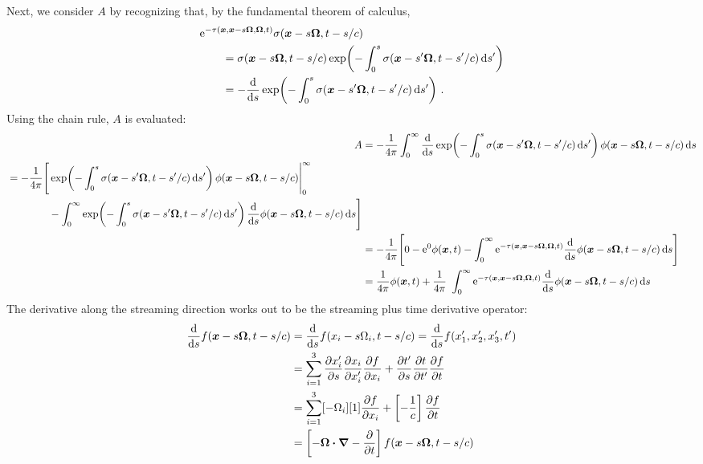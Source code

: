 Next, we consider $A$ by recognizing that, by the fundamental theorem of
calculus,
\begin{align*}
  \lefteqn{\eexp^{ -\tau(\vec{x}, \vec{x} - s \vec{\Omega}, \vec{\Omega}, t)}
  \sigma(\vec{x} - s \vec{\Omega}, t-s/c)}\qquad&
  \\
  &= \sigma(\vec{x} - s \vec{\Omega}, t-s/c) \expp{ -\int_{0}^{s}
  \sigma(\vec{x}-s'\vec{\Omega}, t-s'/c) \ud s'}
  \\
  &= -\oder{}{s}
    \expp{ -\int_{0}^{s} \sigma(\vec{x}-s'\vec{\Omega}, t-s'/c) \ud s'}\,.
\end{align*}
Using the chain rule, $A$ is evaluated:
\begin{align*}
  A &= 
  -\frac{1}{4\pi}\int_{0}^{\infty}
  \oder{}{s}
    \expp{- \int_{0}^{s} \sigma(\vec{x}-s'\vec{\Omega}, t-s'/c) \ud s'}
  \phi(\vec{x} - s \vec{\Omega}, t-s/c)
  \ud s
  \\
    \begin{split}
  &=-\frac{1}{4\pi} \Bigg[ 
\expp{- \int_{0}^{s} \sigma(\vec{x}-s'\vec{\Omega}, t-s'/c) \ud s'} 
\phi(\vec{x} - s \vec{\Omega}, t-s/c) \Bigg|_{0}^{\infty}
\\
&\qquad\qquad- \int_{0}^{\infty} \expp{- \int_{0}^{s} \sigma(\vec{x}-s'\vec{\Omega}, t-s'/c) \ud s'}
\oder{}{s} \phi(\vec{x} - s \vec{\Omega}, t-s/c)
\ud s
  \Bigg]
    \end{split}
  \\
  &=-\frac{1}{4\pi} \Bigg[ 
0 -  
\eexp^0 \phi(\vec{x}, t)
- \int_{0}^{\infty} \eexp^{-\tau(\vec{x}, \vec{x} - s \vec{\Omega}, \vec{\Omega}, t)}
\oder{}{s} \phi(\vec{x} - s \vec{\Omega}, t-s/c)
\ud s
  \Bigg]
  \\
 &=\frac{1}{4\pi}\phi(\vec{x}, t)
+ \frac{1}{4\pi}\ \int_{0}^{\infty} \eexp^{-\tau(\vec{x}, \vec{x} - s \vec{\Omega}, \vec{\Omega}, t)}
\oder{}{s} \phi(\vec{x} - s \vec{\Omega}, t-s/c)
\ud s
\end{align*}
The derivative along the streaming direction works out to be the streaming plus
time derivative operator:
\begin{align*}
  \frac{\mathrm{d} }{\mathrm{d} s} f(\bm{x} - s \bm{\Omega}, t-s/c)
  &=  \frac{\mathrm{d} }{\mathrm{d} s} f(x_i - s \Omega_i, t-s/c)
  = \frac{\mathrm{d} }{\mathrm{d} s} f(x_1',x_2',x_3',t')
  \\
  &= \sum_{i=1}^{3}
  \frac{\partial x_i'}{\partial s}\frac{\partial x_i}{\partial x_i'} \frac{\partial f}{\partial x_i}
  + \frac{\partial t'}{\partial s}\frac{\partial t}{\partial t'} \frac{\partial f}{\partial t}
  \\
  &= \sum_{i=1}^{3} [- \Omega_i][1]\frac{\partial f}{\partial x_i} 
  + \left[ -\frac{1}{c} \right]  \frac{\partial f}{\partial t}
  \\
  &= \left[ -\bm{\Omega} \bm{\cdot} \bm{\nabla} - \frac{\partial }{\partial t} \right]
    f(\bm{x} - s \bm{\Omega}, t-s/c)
\end{align*}
